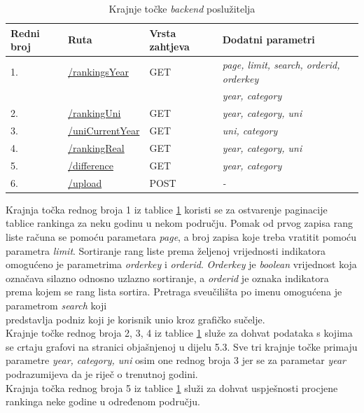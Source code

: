 \documentclass[times, utf8, zavrsni]{fer}
\begin{document}
\begin{table}[htb]
    \caption{Krajnje točke \emph{backend} poslužitelja}
        \label{tbl:endpoints}
        \centering
        \begin{tabular}{llll} \hline
        Redni broj & Ruta & Vrsta zahtjeva & Dodatni parametri\\ \hline
        1. & \url{/rankingsYear} & GET & \emph{page, limit, search, orderid, orderkey} \\
        &&&\emph{year, category}
        \\2. & \url{/rankingUni} & GET & \emph{year, category, uni}
        \\3. & \url{/uniCurrentYear} & GET & \emph{uni, category}
        \\4. & \url{/rankingReal} & GET & \emph{year, category, uni}
        \\5. & \url{/difference} & GET & \emph{ year, category}
        \\6. & \url{/upload} & POST & \emph{-}
        \end{tabular}
        \end{table} 
        \FloatBarrier
Krajnja točka rednog broja 1 iz tablice \ref{tbl:endpoints} koristi se za ostvarenje paginacije tablice rankinga za neku godinu u nekom području.
Pomak od prvog zapisa rang liste računa se pomoću parametara \emph{page}, a broj zapisa koje treba vratitit pomoću parametra \emph{limit}.
Sortiranje rang liste prema željenoj vrijednosti indikatora omogućeno je parametrima \emph{orderkey} i \emph{orderid}.
\emph{Orderkey} je \emph{boolean} vrijednost koja označava silazno odnosno uzlazno sortiranje, a \emph{orderid} je oznaka indikatora
prema kojem se rang lista sortira. Pretraga sveučilišta po imenu omogućena je parametrom \emph{search} koji \\predstavlja podniz koji je korisnik unio 
kroz grafičko sučelje.
\\

Krajnje točke rednog broja 2, 3, 4 iz tablice \ref{tbl:endpoints} služe za dohvat podataka s kojima se crtaju grafovi na stranici objašnjenoj u 
dijelu 5.3. Sve tri krajnje točke primaju parametre \emph{year, category, uni} osim one rednog broja 3 jer se za parametar \emph{year} podrazumijeva 
da je riječ o trenutnoj godini.
\\

Krajnja točka rednog broja 5 iz tablice \ref{tbl:endpoints} služi za dohvat uspješnosti procjene \\rankinga neke godine u određenom području.
\\
\end{document}
